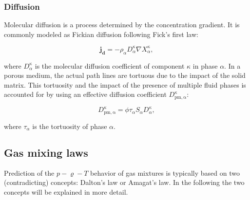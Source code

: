 \subsubsection{Diffusion}\label{sec:Diffusion}
Molecular diffusion is a process determined by the concentration gradient.
It is commonly modeled as Fickian diffusion following Fick's first law:

\begin{equation} \label{eq:Diffusion}
\mathbf{j_d}=-\rho_{\alpha} D^\kappa_\alpha \nabla X^\kappa_\alpha,
\end{equation}

where $D^\kappa_\alpha$ is the molecular diffusion coefficient of component $\kappa$ in phase $\alpha$.
In a porous medium, the actual path lines are tortuous due to the impact of the solid matrix.
This tortuosity and the impact of the presence of multiple fluid phases
is accounted for by using an effective diffusion coefficient $D^\kappa_\mathrm{pm, \alpha}$:

\begin{equation} \label{eq:diffusion_coeff_pm}
D^\kappa_\mathrm{pm, \alpha}= \phi \tau_\alpha S_\alpha D^\kappa_\alpha,
\end{equation}

where $\tau_\alpha$ is the tortuosity of phase $\alpha$.

\subsection{Gas mixing laws}
Prediction of the $p-\varrho-T$ behavior of gas mixtures is typically based on two (contradicting) concepts: Dalton's law or Amagat's law.
In the following the two concepts will be explained in more detail.
%
